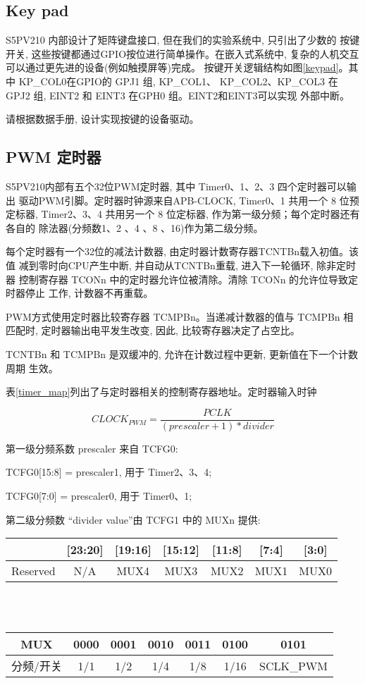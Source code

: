 \subsection{Key pad}
	S5PV210 内部设计了矩阵键盘接口, 但在我们的实验系统中, 只引出了少数的
按键开关, 这些按键都通过GPIO按位进行简单操作。在嵌入式系统中, 复杂的人机交互
可以通过更先进的设备(例如触摸屏等)完成。
按键开关逻辑结构如图\ref{keypad}。其中 KP\_COL0在GPIO的 GPJ1 组, KP\_COL1、
KP\_COL2、KP\_COL3 在GPJ2 组, EINT2 和 EINT3 在GPH0 组。EINT2和EINT3可以实现
外部中断。

	请根据数据手册, 设计实现按键的设备驱动。

\subsection{PWM 定时器}
	S5PV210内部有五个32位PWM定时器, 其中 Timer0、1、2、3 四个定时器可以输出
驱动PWM引脚。定时器时钟源来自APB-CLOCK, Timer0、1 共用一个 8 位预定标器,
Timer2、3、4 共用另一个 8 位定标器, 作为第一级分频；每个定时器还有各自的
除法器(分频数1、2 、4 、8 、16)作为第二级分频。

	每个定时器有一个32位的减法计数器, 由定时器计数寄存器TCNTBn载入初值。该值
减到零时向CPU产生中断, 并自动从TCNTBn重载, 进入下一轮循环, 除非定时器
控制寄存器 TCONn 中的定时器允许位被清除。清除 TCONn 的允许位导致定时器停止
工作, 计数器不再重载。

	PWM方式使用定时器比较寄存器 TCMPBn。当递减计数器的值与 TCMPBn 相匹配时, 
定时器输出电平发生改变, 因此, 比较寄存器决定了占空比。

	TCNTBn 和 TCMPBn 是双缓冲的, 允许在计数过程中更新, 更新值在下一个计数周期
生效。

	表\ref{timer_map}列出了与定时器相关的控制寄存器地址。定时器输入时钟

$$ CLOCK_{PWM} = \frac{PCLK}{(prescaler+1)*divider} $$

第一级分频系数 prescaler 来自 TCFG0:

	TCFG0[15:8] = prescaler1, 用于 Timer2、3、4;

	TCFG0[7:0] = prescaler0, 用于 Timer0、1;

	第二级分频数 ``divider value''由 TCFG1 中的 MUXn 提供:

\begin{center}
\begin{tabular}{|c|c|c|c|c|c|c|}
\hline
  [31:24] & [23:20] & [19:16] & [15:12] & [11:8] & [7:4] & [3:0] \\\hline
  Reserved & N/A & MUX4 & MUX3 & MUX2 & MUX1 & MUX0 \\\hline
\end{tabular}
 \ \\ \ \\

\begin{tabular}{|c|c|c|c|c|c|c|}
\hline
    MUX &  0000 & 0001 & 0010 & 0011 & 0100 & 0101 \\\hline
	分频/开关 &1/1 & 1/2 & 1/4 & 1/8 & 1/16 & SCLK\_PWM \\\hline
\end{tabular}
\end{center}

